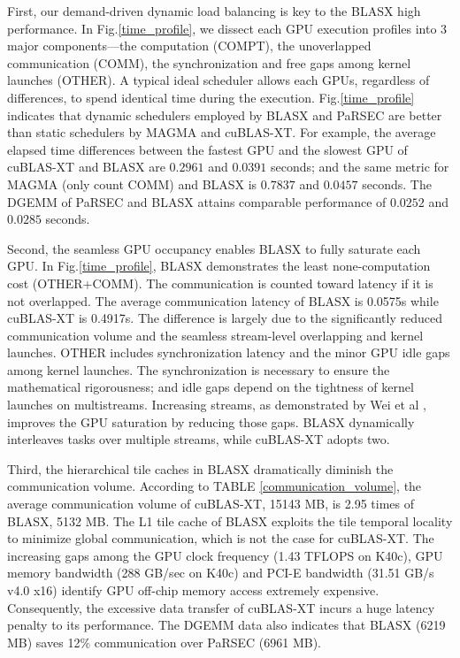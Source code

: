 \documentclass[conference]{IEEEtran}
\begin{document}
First, our demand-driven dynamic load balancing is key to the BLASX high performance.
In Fig.\ref{time_profile}, we dissect each GPU execution profiles into 3 major
components---the computation (COMPT), the unoverlapped communication (COMM), the 
synchronization and free gaps among kernel launches (OTHER). A typical ideal scheduler 
allows each GPUs, regardless of differences, to spend identical time during the execution. 
Fig.\ref{time_profile} indicates that dynamic schedulers employed by BLASX and PaRSEC 
are better than static schedulers by MAGMA and cuBLAS-XT. For example, the average elapsed time
differences between the fastest GPU and the slowest GPU of cuBLAS-XT and BLASX are $0.2961$
and $0.0391$ seconds; and the same metric for MAGMA (only count COMM) and BLASX is $0.7837$ 
and $0.0457$ seconds. The DGEMM of PaRSEC and BLASX attains comparable performance of $0.0252$ 
and $0.0285$ seconds.

Second, the seamless GPU occupancy enables BLASX to fully saturate each GPU. In Fig.\ref{time_profile},
BLASX demonstrates the least none-computation cost (OTHER+COMM). The communication is counted 
toward latency if it is not overlapped. The average communication latency 
of BLASX is 0.0575s while cuBLAS-XT is 0.4917s. The difference is largely due to the significantly reduced communication volume and the seamless stream-level overlapping and kernel launches. 
OTHER includes synchronization latency and the minor GPU idle gaps among kernel launches. The synchronization 
is necessary to ensure the mathematical rigorousness; and idle gaps depend on the tightness 
of kernel launches on multistreams. Increasing streams, as demonstrated by Wei et al \cite{PaRSEC}, 
improves the GPU saturation by reducing those gaps. BLASX dynamically interleaves tasks over 
multiple streams, while cuBLAS-XT adopts two.

Third, the hierarchical tile caches in BLASX dramatically diminish the communication volume.
According to TABLE \ref{communication_volume}, the average communication volume of cuBLAS-XT, 15143 MB, 
is 2.95 times of BLASX, 5132 MB. The L1 tile cache of BLASX exploits the tile temporal locality 
to minimize global communication, which is not the case for cuBLAS-XT. The increasing 
gaps among the GPU clock frequency (1.43 TFLOPS on K40c), GPU memory bandwidth (288 GB/sec on K40c)
and PCI-E bandwidth (31.51 GB/s v4.0 x16) identify GPU off-chip memory access extremely 
expensive. Consequently, the excessive data transfer of cuBLAS-XT incurs a huge latency penalty to its 
performance. The DGEMM data also indicates that BLASX (6219 MB) saves 12\% communication
over PaRSEC (6961 MB).
\end{document}
